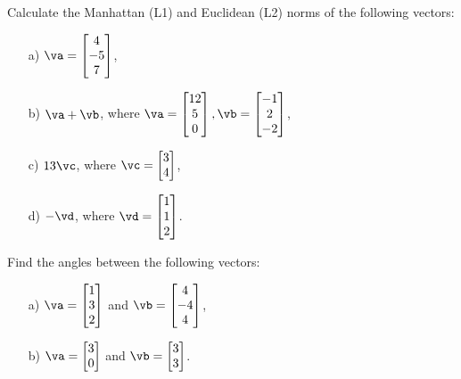 \medskip


\begin{problem}
    Calculate the Manhattan (L1) and Euclidean (L2) norms of the following vectors:

    \begin{enumerate}
        \item[a) ] $\va= \begin{bmatrix} 4\\-5\\7 \end{bmatrix}$,
        
        \item[b) ] $\va+\vb$, where $\va= \begin{bmatrix}12\\5\\0\end{bmatrix}, \vb = \begin{bmatrix} -1\\2\\-2\end{bmatrix}$,
        
        \item[c) ] $13\vc$, where $\vc= \begin{bmatrix}3\\4\end{bmatrix}$,
        
        \item[d) ] $-\vd$, where $\vd= \begin{bmatrix}1\\1\\2\end{bmatrix}$.
    \end{enumerate}
\end{problem}
\bigskip


\begin{problem}
    Find the angles between the following vectors:

    \begin{enumerate}
        \item[a) ] $\va= \begin{bmatrix} 1\\3\\2\end{bmatrix}$ and $\vb= \begin{bmatrix} 4\\-4\\4\end{bmatrix}$,
        
        \item[b) ] $\va= \begin{bmatrix} 3\\0\end{bmatrix}$ and $\vb= \begin{bmatrix} 3\\3\end{bmatrix}$.
        
    \end{enumerate}
\end{problem}
\newpage

